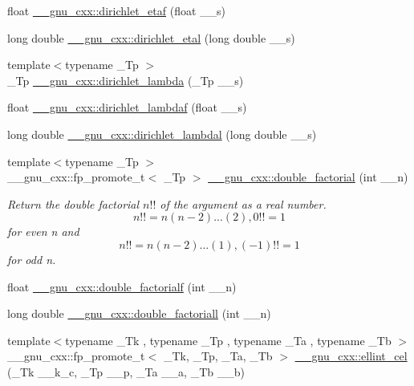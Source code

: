 \begin{DoxyCompactItemize}
\item 
float \hyperlink{group__mathsf__gnu_ga6f05d076600b1de9193e586cf89547c9}{\+\_\+\+\_\+gnu\+\_\+cxx\+::dirichlet\+\_\+etaf} (float \+\_\+\+\_\+s)
\item 
long double \hyperlink{group__mathsf__gnu_ga408e2267b648f29445522dbafb7a0e1a}{\+\_\+\+\_\+gnu\+\_\+cxx\+::dirichlet\+\_\+etal} (long double \+\_\+\+\_\+s)
\item 
{\footnotesize template$<$typename \+\_\+\+Tp $>$ }\\\+\_\+\+Tp \hyperlink{group__mathsf__gnu_ga06842a81bdcabf9c62252dde992d42ee}{\+\_\+\+\_\+gnu\+\_\+cxx\+::dirichlet\+\_\+lambda} (\+\_\+\+Tp \+\_\+\+\_\+s)
\item 
float \hyperlink{group__mathsf__gnu_gaafd3ca6b0d71d55d3835536396eece8f}{\+\_\+\+\_\+gnu\+\_\+cxx\+::dirichlet\+\_\+lambdaf} (float \+\_\+\+\_\+s)
\item 
long double \hyperlink{group__mathsf__gnu_gab28d06c4e3c7457f1fa3663168678fb2}{\+\_\+\+\_\+gnu\+\_\+cxx\+::dirichlet\+\_\+lambdal} (long double \+\_\+\+\_\+s)
\item 
{\footnotesize template$<$typename \+\_\+\+Tp $>$ }\\\+\_\+\+\_\+gnu\+\_\+cxx\+::fp\+\_\+promote\+\_\+t$<$ \+\_\+\+Tp $>$ \hyperlink{group__mathsf__gnu_ga1e62c47f84f9782828f8830b4fedc13c}{\+\_\+\+\_\+gnu\+\_\+cxx\+::double\+\_\+factorial} (int \+\_\+\+\_\+n)
\begin{DoxyCompactList}\small\item\em Return the double factorial $ n!! $ of the argument as a real number. \[ n!! = n(n-2)...(2), 0!! = 1 \] for even {\ttfamily n} and \[ n!! = n(n-2)...(1), (-1)!! = 1 \] for odd {\ttfamily n}. \end{DoxyCompactList}\item 
float \hyperlink{group__mathsf__gnu_ga85ec284e603f32d18970bbdbb12d5150}{\+\_\+\+\_\+gnu\+\_\+cxx\+::double\+\_\+factorialf} (int \+\_\+\+\_\+n)
\item 
long double \hyperlink{group__mathsf__gnu_ga0366730a4a775256217ef1cd9d0c3a04}{\+\_\+\+\_\+gnu\+\_\+cxx\+::double\+\_\+factoriall} (int \+\_\+\+\_\+n)
\item 
{\footnotesize template$<$typename \+\_\+\+Tk , typename \+\_\+\+Tp , typename \+\_\+\+Ta , typename \+\_\+\+Tb $>$ }\\\+\_\+\+\_\+gnu\+\_\+cxx\+::fp\+\_\+promote\+\_\+t$<$ \+\_\+\+Tk, \+\_\+\+Tp, \+\_\+\+Ta, \+\_\+\+Tb $>$ \hyperlink{group__mathsf__gnu_ga6e44a0d90500e56ef4b3aba6efd7e2b0}{\+\_\+\+\_\+gnu\+\_\+cxx\+::ellint\+\_\+cel} (\+\_\+\+Tk \+\_\+\+\_\+k\+\_\+c, \+\_\+\+Tp \+\_\+\+\_\+p, \+\_\+\+Ta \+\_\+\+\_\+a, \+\_\+\+Tb \+\_\+\+\_\+b)

\end{DoxyCompactItemize}

